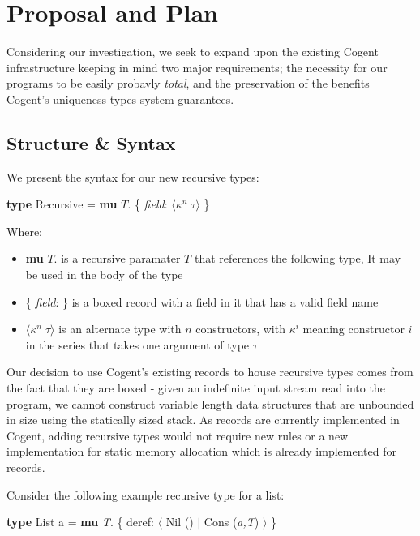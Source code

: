 \chapter{Proposal and Plan}\label{ch:style}

Considering our investigation, we seek to expand upon the existing Cogent infrastructure keeping in mind
two major requirements; the necessity for our programs to be easily probavly \textit{total}, and the preservation 
of the benefits Cogent's uniqueness types system guarantees.



\section{Structure \& Syntax}

We present the syntax for our new recursive types:

\begin{center}
    \textbf{type} Recursive = \textbf{mu} $T$. \{ \textit{field}: $\langle \overline{\kappa^n\; \tau} \rangle$ \}
\end{center}

Where:
\begin{itemize}
    \item
        \textbf{mu} $T$. is a recursive paramater $T$ that references the following type,
        It may be used in the body of the type
    \item
        \{ \textit{field}: \} is a boxed record with a field in it that has a valid field name
    \item 
        $\langle \overline{\kappa^n\; \tau} \rangle$ is an alternate type with $n$ constructors, 
        with $\kappa^i$ meaning constructor $i$ in the series that takes one argument of type $\tau$
\end{itemize}

Our decision to use Cogent's existing records to house recursive types comes from the fact that they are boxed -
given an indefinite input stream read into the program, we cannot construct variable length data structures that
are unbounded in size using the statically sized stack. As records are currently implemented in Cogent,
adding recursive types would not require new rules or a new implementation for static memory allocation which
is already implemented for records.

Consider the following example recursive type for a list:

\begin{center}
    \textbf{type} List a = \textbf{mu} \textit{T}. \{ deref: $\langle$ Nil () $\vert$ Cons (\textit{a,T}) $\rangle$ \}
\end{center}

